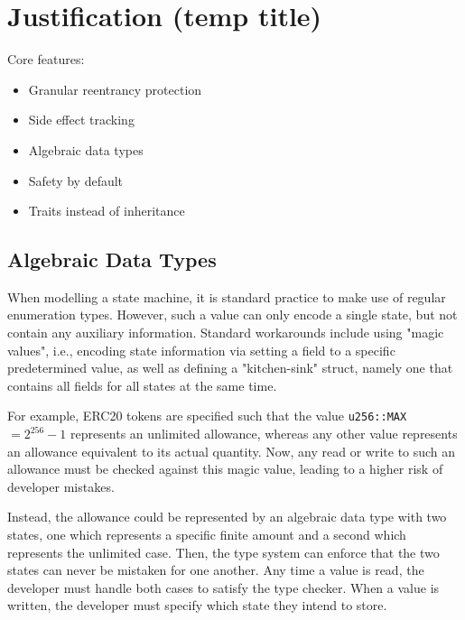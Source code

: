 
\chapter{Justification (temp title)}
\label{ch:justification}

Core features:
\begin{itemize}
   \item Granular reentrancy protection
   \item Side effect tracking
   \item Algebraic data types
   \item Safety by default
   \item Traits instead of inheritance
\end{itemize}

\section{Algebraic Data Types}
When modelling a state machine, it is standard practice to make use of regular enumeration types. However, such a value can only encode a single state, but not contain any auxiliary information. Standard workarounds include using "magic values", i.e., encoding state information via setting a field to a specific predetermined value, as well as defining a "kitchen-sink" struct, namely one that contains all fields for all states at the same time.

For example, ERC20 tokens are specified such that the value \lstinline{u256::MAX} $= 2^{256}-1$ represents an unlimited allowance, whereas any other value represents an allowance equivalent to its actual quantity. Now, any read or write to such an allowance must be checked against this magic value, leading to a higher risk of developer mistakes.

Instead, the allowance could be represented by an algebraic data type with two states, one which represents a specific finite amount and a second which represents the unlimited case. Then, the type system can enforce that the two states can never be mistaken for one another. Any time a value is read, the developer must handle both cases to satisfy the type checker. When a value is written, the developer must specify which state they intend to store.

